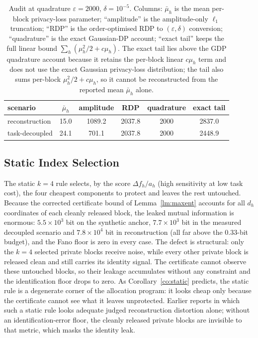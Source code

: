 \documentclass[10pt,twocolumn,letterpaper]{article}
\theoremstyle{plain}
\theoremstyle{definition}
\begin{document}
\begin{table}[t]
\centering\footnotesize
\setlength{\tabcolsep}{3.0pt}
\caption{Audit at quadrature $\varepsilon{=}2000$, $\delta{=}10^{-5}$.
Columns: $\bar\mu_h$ is the mean per-block privacy-loss parameter;
``amplitude'' is the amplitude-only $\ell_1$ truncation; ``RDP'' is the
order-optimised RDP to $(\varepsilon,\delta)$ conversion; ``quadrature'' is the
exact Gaussian-DP account; ``exact tail'' keeps the full linear bound
$\sum_h(\mu_h^2/2+c\mu_h)$. The exact tail lies above the GDP quadrature
account because it retains the per-block linear $c\mu_h$ term and does not use
the exact Gaussian privacy-loss distribution; the tail also sums per-block
$\mu_h^2/2+c\mu_h$, so it cannot be reconstructed from the reported mean
$\bar\mu_h$ alone.}
\label{tab:audit}
\begin{tabular}{lccccc}
\toprule
scenario & $\bar\mu_h$ & amplitude & RDP & quadrature & exact tail \\
\midrule
reconstruction & 15.0 & 1089.2 & 2037.8 & 2000 & 2837.0 \\
task-decoupled & 24.1 & 701.1 & 2037.8 & 2000 & 2448.9 \\
\bottomrule
\end{tabular}
\end{table}

\subsection{Static Index Selection}

The static $k=4$ rule selects, by the score $\Delta f_h/a_h$ (high sensitivity
at low task cost), the four cheapest components to protect and leaves the rest
untouched. Because the corrected certificate bound of Lemma~\ref{lm:maxent}
accounts for all $d_h$ coordinates of each cleanly released block, the leaked
mutual information is enormous: $5.5\times10^{3}$ bit on the synthetic anchor,
$7.7\times10^{3}$ bit in the measured decoupled scenario and $7.8\times10^{4}$ bit
in reconstruction (all far above the $0.33$-bit budget), and the Fano floor is
zero in every case. The defect is structural: only the $k=4$
selected private blocks receive noise, while every other private block is
released clean and still carries its identity signal. The certificate cannot
observe these untouched blocks, so their leakage accumulates without any
constraint and the identification floor drops to zero. As
Corollary~\ref{co:static} predicts, the
static rule is a degenerate corner of the allocation program: it looks cheap
only because the certificate cannot see what it leaves unprotected. Earlier
reports in which such a static rule looks adequate judged reconstruction
distortion alone; without an identification-error floor, the cleanly released
private blocks are invisible to that metric, which masks the identity leak.
\end{document}
